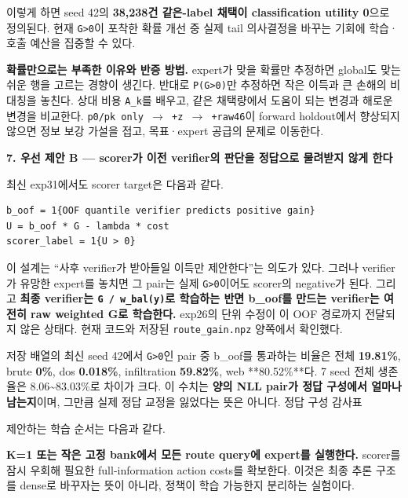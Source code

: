 이렇게 하면 seed 42의 \textbf{38,238건 같은-label 채택이 classification utility 0}으로 정의된다. 현재 \texttt{G>0}이 포착한 확률 개선 중 실제 tail 의사결정을 바꾸는 기회에 학습·호출 예산을 집중할 수 있다.

\textbf{확률만으로는 부족한 이유와 반증 방법.} expert가 맞을 확률만 추정하면 global도 맞는 쉬운 행을 고르는 경향이 생긴다. 반대로 \texttt{P(G>0)}만 추정하면 작은 이득과 큰 손해의 비대칭을 놓친다. 상대 비용 \texttt{A\_\allowbreak{}\allowbreak{}k}를 배우고, 같은 채택량에서 도움이 되는 변경과 해로운 변경을 비교한다. \texttt{p0/\allowbreak{}\allowbreak{}pk on\allowbreak{}ly   \ensuremath{\rightarrow}   +\allowbreak{}\allowbreak{}z   \ensuremath{\rightarrow}   +\allowbreak{}\allowbreak{}r\allowbreak{}aw46}이 forward holdout에서 향상되지 않으면 정보 보강 가설을 접고, 목표·expert 공급의 문제로 이동한다.

\textbf{7. 우선 제안 B — scorer가 이전 verifier의 판단을 정답으로 물려받지 않게 한다}

최신 exp31에서도 scorer target은 다음과 같다.


\begin{Verbatim}[breaklines=true,breakanywhere=true,fontsize=\scriptsize]
b_oof = 1{OOF quantile verifier predicts positive gain}
U = b_oof * G - lambda * cost
scorer_label = 1{U > 0}

\end{Verbatim}
이 설계는 “사후 verifier가 받아들일 이득만 제안한다”는 의도가 있다. 그러나 verifier가 유망한 expert를 놓치면 그 pair는 실제 \texttt{G>0}이어도 scorer의 negative가 된다. 그리고 \textbf{최종 verifier는 \texttt{G /\allowbreak{}\allowbreak{} w\_\allowbreak{}\allowbreak{}ba\allowbreak{}l(y)}로 학습하는 반면 b\_\allowbreak{}oof를 만드는 verifier는 여전히 raw weighted G로 학습한다.} exp26의 단위 수정이 이 OOF 경로까지 전달되지 않은 상태다. 현재 코드와 저장된 \texttt{route\_\allowbreak{}\allowbreak{}ga\allowbreak{}in.\allowbreak{}npz} 양쪽에서 확인했다.

저장 배열의 최신 seed 42에서 \texttt{G>0}인 pair 중 b\_\allowbreak{}oof를 통과하는 비율은 전체 \textbf{19.81\%}, brute \textbf{0\%}, dos \textbf{0.018\%}, infiltration \textbf{59.82\%}, web **80.52\%**다. 7 seed 전체 생존율은 8.06\textasciitilde{}83.03\%로 차이가 크다. 이 수치는 \textbf{양의 NLL pair가 정답 구성에서 얼마나 남는지}이며, 그만큼 실제 정답 교정을 잃었다는 뜻은 아니다. 정답 구성 감사표

제안하는 학습 순서는 다음과 같다.

\par\noindent \textbullet\enspace \textbf{K=\allowbreak{}1 또는 작은 고정 bank에서 모든 route query에 expert를 실행한다.} scorer를 잠시 우회해 필요한 full-information action costs를 확보한다. 이것은 최종 추론 구조를 dense로 바꾸자는 뜻이 아니라, 정책이 학습 가능한지 분리하는 실험이다.


